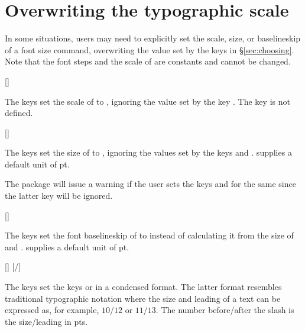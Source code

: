 \documentclass{beery}
\begin{document}
\section{Overwriting the typographic scale}
\label{sec:overwriting}

In some situations, users may need to explicitly set the scale, size, or baselineskip of a font size command, overwriting the value set by the keys in \S\ref{sec:choosing}.
Note that the font steps and the scale of  are constants and cannot be changed.

[]
\KeepNextPar*

The keys  set the scale of  to , ignoring the value set by the key .
The key  is not defined.

[]
\KeepNextPar*

The keys  set the size of  to , ignoring the values set by the keys  and .
 supplies a default unit of \unit{pt}.

The package will issue a warning if the user sets the keys  and  for the same  since the latter key will be ignored.

[]
\KeepNextPar*

The keys  set the font baselineskip of  to  instead of calculating it from the size of  and .
 supplies a default unit of \unit{pt}.

[]
\nopagebreak\newline
{}[/]

The keys  set the keys  or  in a condensed format.
The latter format resembles traditional typographic notation where the size and leading of a text can be expressed as, for example, $10/12$ or $11/13$.
The number before/after the slash is the size/leading in \unit{pts}.
\end{document}
